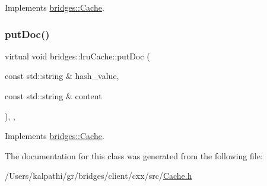 Implements \mbox{\hyperlink{classbridges_1_1_cache_abf3601225841d14dcd5611cd6a223ba4}{bridges\+::\+Cache}}.

\mbox{\label{classbridges_1_1lru_cache_a927fa1186ba830717ce11898c2beb4c7}} 
\subsubsection{\texorpdfstring{put\+Doc()}{putDoc()}}
{\footnotesize\ttfamily virtual void bridges\+::lru\+Cache\+::put\+Doc (\begin{DoxyParamCaption}\item[{const std\+::string \&}]{hash\+\_\+value,  }\item[{const std\+::string \&}]{content }\end{DoxyParamCaption})\hspace{0.3cm}{\ttfamily [inline]}, {\ttfamily [override]}, {\ttfamily [virtual]}}



Implements \mbox{\hyperlink{classbridges_1_1_cache_ae74225542568a377fdcaf0354e466954}{bridges\+::\+Cache}}.



The documentation for this class was generated from the following file\+:\begin{DoxyCompactItemize}
\item 
/\+Users/kalpathi/gr/bridges/client/cxx/src/\mbox{\hyperlink{_cache_8h}{Cache.\+h}}\end{DoxyCompactItemize}
